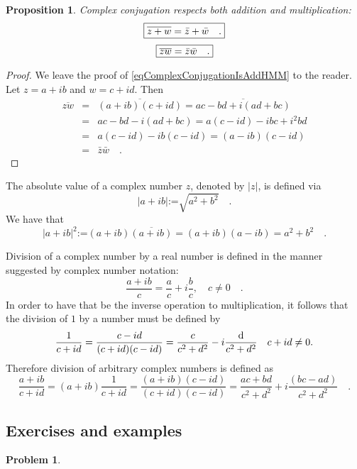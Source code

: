 \documentclass[12pt]{book}
\newcommand{\eqdef}{\textbf{:=}}
\newtheorem{problem}[theorem]{Problem}
\newtheorem{prop}[theorem]{Proposition}
\begin{document}
\begin{prop}
Complex conjugation respects both addition and multiplication:
\begin{equation} \boxed{
\label{eqComplexConjugationIsAddHMM}
\overline {z +w}= \bar z +\bar w\quad .
}
\end{equation}
\begin{equation}\boxed{
\label{eqComplexConjugationIsFieldHMM}  \overline {z w}= \bar z \bar w\quad .
}
\end{equation}

\end{prop}
\begin{proof}
We leave the proof of \eqref{eqComplexConjugationIsAddHMM} to the reader. Let $z= a+ib$ and $w=c+id$. Then
\begin{equation*}
\begin{array}{rcl}\overline {zw}&=& \overline{(a+ib)(c+id)}= \overline{ac-bd +i(ad+bc) }\\&=& ac-bd-i(ad+bc)= a(c-id)-ibc+i^{2}bd\\&=& a(c-id)-ib(c-id)= (a-ib)(c-id)\\&=&\bar z \bar w\quad .
\end{array}
\end{equation*}
\end{proof}
  The absolute value of a complex number $z$, denoted by $|z|$, is defined via
\[
|a+ib|\eqdef \sqrt{a^2+b^2}\quad .
\]
We have that
\[
|a+ib|^2\eqdef (a+ib)\overline{(a+ib)}=(a+ib)(a-ib)=a^2+b^2 \quad .
\]

Division of a complex number by a real number is defined in the manner suggested by complex number notation:
\[
\frac{a+ib}{c}= \frac{a}{c}+i\frac{b}{c}, \quad c\neq 0\quad .
\]
In order to have that be the inverse operation to multiplication, it follows that the division of $1$ by a number must be defined by
\[
\frac{1}{c+id}= \frac{c-id}{(c+id)(c-id)}=\frac{c}{c^2+d^2}-i\frac{{\normalfont \text{d}}}{c^2+d^2}  \quad c+id\neq 0.
\]
Therefore division of arbitrary complex numbers is defined as
\[
\frac{a+ib}{c+id}=(a+ib)\frac{1}{c+id}= \frac{(a+ib)(c-id)}{(c+id)(c-id)}= \frac{ac+bd}{c^2+d^2}+i\frac{(bc-ad)}{c^2+d^2} \quad .
\]

\subsection{Exercises and examples}
\begin{problem}
%
\end{problem}
%
\end{document}

